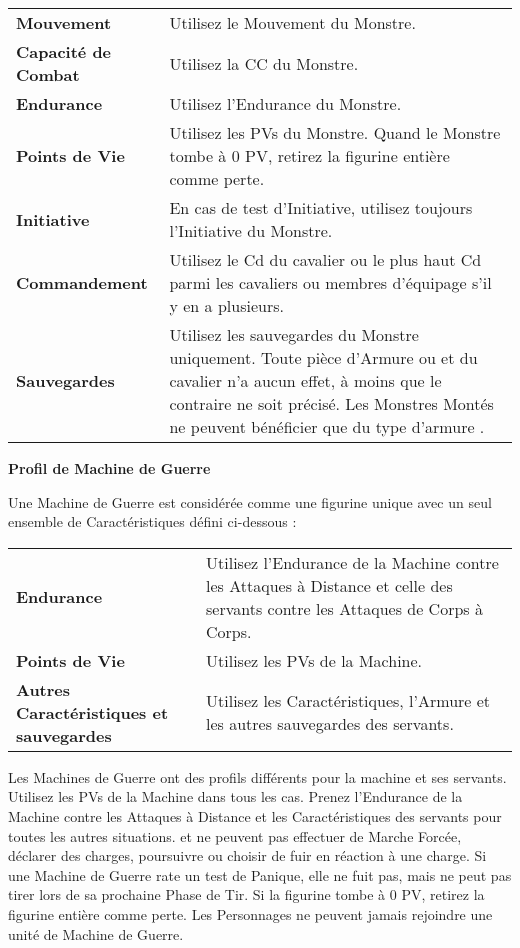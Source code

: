 \renewcommand{\arraystretch}{2.5}
\begin{center}
\begin{tabular}{>{\bfseries\raggedleft}p{3cm}p{12cm}}
\hline
Mouvement & Utilisez le Mouvement du Monstre. \tabularnewline
Capacité de Combat & Utilisez la CC du Monstre. \tabularnewline
Endurance & Utilisez l'Endurance du Monstre. \tabularnewline
Points de Vie & Utilisez les PVs du Monstre. Quand le Monstre tombe à 0 PV, retirez la figurine entière comme perte. \tabularnewline
Initiative & En cas de test d'Initiative, utilisez toujours l'Initiative du Monstre. \tabularnewline
Commandement & Utilisez le Cd du cavalier ou le plus haut Cd parmi les cavaliers ou membres d'équipage s'il y en a plusieurs. \tabularnewline
Sauvegardes & Utilisez les sauvegardes du Monstre uniquement. Toute pièce d'Armure ou \regeneration{} et \wardsave{} du cavalier n'a aucun effet, à moins que le contraire ne soit précisé. Les Monstres Montés ne peuvent bénéficier que du type d'armure \innatedefence{}. \tabularnewline
\hline
\end{tabular}\end{center}
\renewcommand{\arraystretch}{1.5}

\newpage
\noindent\textbf{Profil de Machine de Guerre}

Une Machine de Guerre est considérée comme une figurine unique avec un seul ensemble de Caractéristiques défini ci-dessous :

\renewcommand{\arraystretch}{2.5}
\begin{center}
\begin{tabular}{>{\bfseries\raggedleft}p{4.5cm}p{10.5cm}}
\hline
Endurance & Utilisez l'Endurance de la Machine contre les Attaques à Distance et celle des servants contre les Attaques de Corps à Corps. \tabularnewline
Points de Vie & Utilisez les PVs de la Machine. \tabularnewline
Autres Caractéristiques et sauvegardes & Utilisez les Caractéristiques, l'Armure et les autres sauvegardes des servants. \tabularnewline
\hline
\end{tabular}\end{center}
\renewcommand{\arraystretch}{1.5}

Les Machines de Guerre ont des profils différents pour la machine et ses servants. Utilisez les PVs de la Machine dans tous les cas. Prenez l'Endurance de la Machine contre les Attaques à Distance et les Caractéristiques des servants pour toutes les autres situations.  et ne peuvent pas effectuer de Marche Forcée, déclarer des charges, poursuivre ou choisir de fuir en réaction à une charge. Si une Machine de Guerre rate un test de Panique, elle ne fuit pas, mais ne peut pas tirer lors de sa prochaine Phase de Tir. Si la figurine tombe à 0 PV, retirez la figurine entière comme perte. Les Personnages ne peuvent jamais rejoindre une unité de Machine de Guerre.

